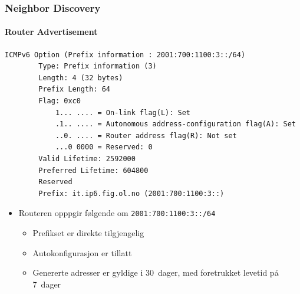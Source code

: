 \begin{frame}[fragile]%
  \frametitle{Neighbor Discovery}
  \framesubtitle{Router Advertisement}
  \begin{multicols}{2}
\begin{Verbatim}[fontsize=\tiny]
    ICMPv6 Option (Prefix information : 2001:700:1100:3::/64)
        Type: Prefix information (3)
        Length: 4 (32 bytes)
        Prefix Length: 64
        Flag: 0xc0
            1... .... = On-link flag(L): Set
            .1.. .... = Autonomous address-configuration flag(A): Set
            ..0. .... = Router address flag(R): Not set
            ...0 0000 = Reserved: 0
        Valid Lifetime: 2592000
        Preferred Lifetime: 604800
        Reserved
        Prefix: it.ip6.fig.ol.no (2001:700:1100:3::)
\end{Verbatim}
  \columnbreak
  \begin{itemize}[<+->]
  \item Routeren opppgir følgende om \texttt{2001:700:1100:3::/64}
    \begin{itemize}[<+->]
    \item Prefikset er direkte tilgjengelig
    \item Autokonfigurasjon er tillatt
    \item Genererte adresser er gyldige i 30~dager, med foretrukket
      levetid på 7~dager
    \end{itemize}
  \end{itemize}
  \end{multicols}
\end{frame}

